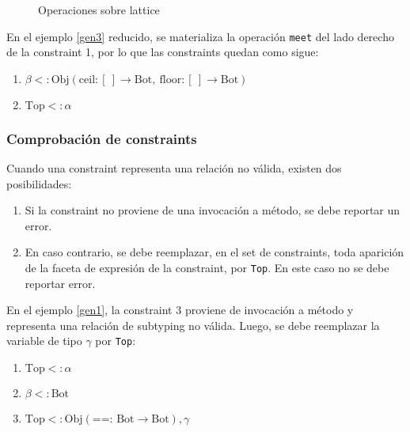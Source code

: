 \begin{figure}[ht]
  \centering
  \label{latticexy}
  \caption{Operaciones sobre lattice}
\end{figure}

En el ejemplo \ref{gen3} reducido, se materializa la operación \texttt{meet} del lado derecho de la constraint 1, por lo que las constraints quedan como sigue:

\begin{enumerate}
  \item $\beta <: \text{Obj}(\text{ceil}: [\ ] \rightarrow \text{Bot},\ \text{floor}: [\ ] \rightarrow \text{Bot})$
  \item $\text{Top} <: \alpha$
\end{enumerate}

\subsubsection{Comprobación de constraints}
Cuando una constraint representa una relación no válida, existen dos posibilidades:

\begin{enumerate}
  \item Si la constraint no proviene de una invocación a método, se debe reportar un error.
  \item En caso contrario, se debe reemplazar, en el set de constraints, toda aparición de la faceta de expresión de la constraint, por \texttt{Top}. En este caso no se debe reportar error.
\end{enumerate}

En el ejemplo \ref{gen1}, la constraint 3 proviene de invocación a método y representa una relación de subtyping no válida. Luego, se debe reemplazar la variable de tipo $\gamma$ por \texttt{Top}:

\begin{enumerate}
  \item $\text{Top} <: \alpha$
  \item $\beta <: \text{Bot}$
  \item $\text{Top} <: \text{Obj}(\text{==: }\text{Bot} \rightarrow \text{Bot}), \gamma$
\end{enumerate}

